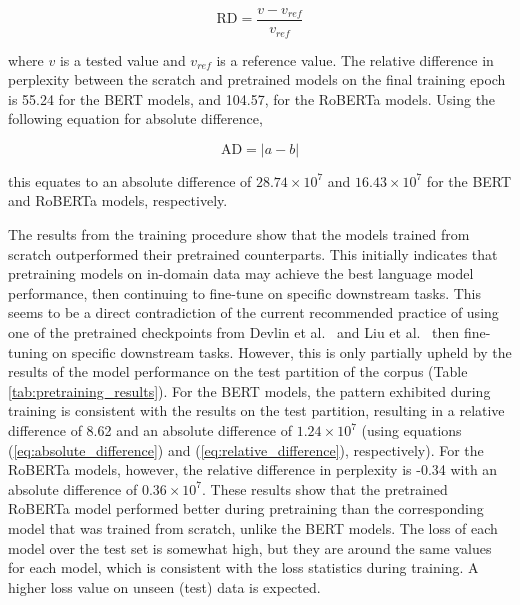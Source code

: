 \documentclass[12pt]{article}
\begin{document}
\begin{equation}\label{eq:relative_difference}
    \mbox{RD} = \frac{v - v_{ref}}{v_{ref}}
\end{equation}

\noindent
where $v$ is a tested value and $v_{ref}$ is a reference value. The relative difference in perplexity between the scratch and pretrained models on the
final training epoch is 55.24 for the BERT models, and 104.57, for the RoBERTa models. Using the following equation for absolute difference,

\begin{equation}\label{eq:absolute_difference}
    \mbox{AD} = |a - b|
\end{equation}

\noindent
this equates to an absolute difference of $28.74 \times 10^7$ and $16.43 \times 10^7$ for the BERT and RoBERTa models, respectively.

The results from the training procedure show that the models trained from scratch outperformed their pretrained counterparts. This initially indicates
that pretraining models on in-domain data may achieve the best language model performance, then continuing to fine-tune on specific downstream tasks.
This seems to be a direct contradiction of the current recommended practice of using one of the pretrained checkpoints from Devlin et
al.~\cite{devlin_bert_2019} and Liu et al.~\cite{liu_roberta_2019} then fine-tuning on specific downstream tasks. However, this is only partially
upheld by the results of the model performance on the test partition of the corpus (Table \ref{tab:pretraining_results}). For the BERT models, the
pattern exhibited during training is consistent with the results on the test partition, resulting in a relative difference of 8.62 and an absolute
difference of $1.24 \times 10^7$ (using equations (\ref{eq:absolute_difference}) and (\ref{eq:relative_difference}), respectively). For the RoBERTa
models, however, the relative difference in perplexity is -0.34 with an absolute difference of $0.36 \times 10^7$. These results show that the
pretrained RoBERTa model performed better during pretraining than the corresponding model that was trained from scratch, unlike the BERT models. The
loss of each model over the test set is somewhat high, but they are around the same values for each model, which is consistent with the loss
statistics during training. A higher loss value on unseen (test) data is expected.
\end{document}

